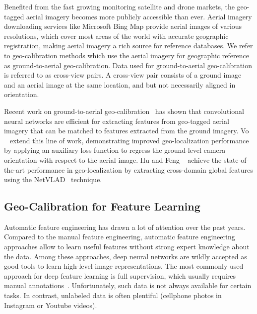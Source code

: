 Benefited from the fast growing monitoring satellite and drone markets,
the geo-tagged aerial imagery becomes more publicly accessible
than ever. Aerial imagery downloading services like
Microsoft Bing Map provide aerial images of various
resolutions, which cover most areas of the world with accurate
geographic registration, making aerial imagery a rich source for
reference databases. We refer to geo-calibration
methods which use the aerial imagery for geographic reference as
ground-to-aerial geo-calibration. Data used for ground-to-aerial
geo-calibration is referred to as cross-view pairs.
A cross-view pair consists of a ground image and an aerial image at
the same location, and but not necessarily aligned in orientation.

Recent work on ground-to-aerial
geo-calibration~\cite{lin2013cross,lin2015learning,workman2015geocnn,workman2015wide}
has shown that convolutional neural networks are efficient for extracting
features from geo-tagged aerial imagery that can be matched to
features extracted from the ground imagery.  Vo
\etal~\cite{vo2016localizing} extend this line of work, demonstrating
improved geo-localization performance by applying an auxiliary loss
function to regress the ground-level camera orientation with respect
to the aerial image. Hu and Feng \etal~\cite{mh2018cvm} achieve the
state-of-the-art performance in geo-localization by extracting
cross-domain global features using the
NetVLAD~\cite{arandjelovic2016netvlad} technique.


\subsection{Geo-Calibration for Feature Learning}

Automatic feature engineering has drawn a lot of attention over the
past years. Compared to the manual feature engineering,
automatic feature engineering approaches allow to learn useful
features without strong expert knowledge about the data. Among these
approaches, deep neural networks are wildly accepted as
good tools to learn high-level image representations.  The most
commonly used approach for deep feature learning is full supervision,
which usually requires manual
annotations~\cite{yosinski2014transferable,zhou2016learning,wen2016discriminative}.
Unfortunately, such data is not always available for certain tasks.
In contrast, unlabeled data is often plentiful (\ie cellphone photos
in Instagram or Youtube videos).

